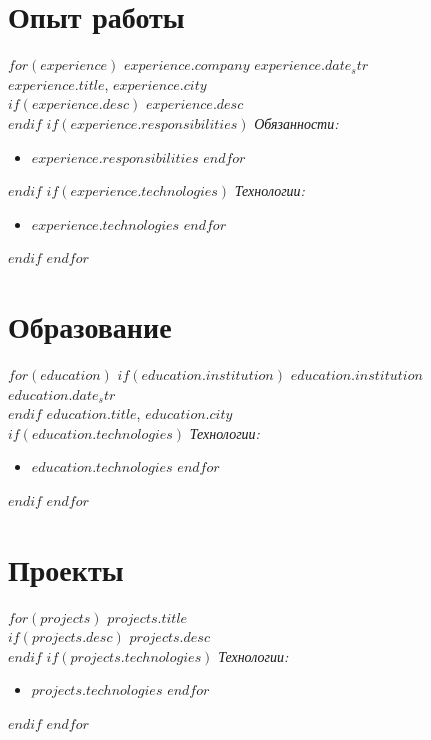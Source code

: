 \documentclass[a4paper,10pt]{article}
\begin{document}
\section*{Опыт работы}
$for(experience)$
    \textbf{$experience.company$} \hfill $experience.date_str$ \\
    $experience.title$, $experience.city$ \\
    $if(experience.desc)$ $experience.desc$ \\ $endif$
    $if(experience.responsibilities)$
    \textit{Обязанности:} \\
    \begin{itemize}
        $for(experience.responsibilities)$
        \item $experience.responsibilities$
        $endfor$
    \end{itemize}
    $endif$
    $if(experience.technologies)$
    \textit{Технологии:} \\
    \begin{itemize}
        $for(experience.technologies)$
        \item $experience.technologies$
        $endfor$
    \end{itemize}
    $endif$
    \vspace{0.2cm}
$endfor$
\section*{Образование}
$for(education)$
    $if(education.institution)$ \textbf{$education.institution$} \hfill $education.date_str$ \\ $endif$
    $education.title$, $education.city$ \\
    $if(education.technologies)$
    \textit{Технологии:} \\
    \begin{itemize}
        $for(education.technologies)$
        \item $education.technologies$
        $endfor$
    \end{itemize}
    $endif$
    \vspace{0.2cm}
$endfor$
\section*{Проекты}
$for(projects)$
    \textbf{$projects.title$} \\
    $if(projects.desc)$ $projects.desc$ \\ $endif$
    $if(projects.technologies)$
    \textit{Технологии:} \\
    \begin{itemize}
        $for(projects.technologies)$
        \item $projects.technologies$
        $endfor$
    \end{itemize}
    $endif$
    \vspace{0.2cm}
$endfor$
\end{document}
